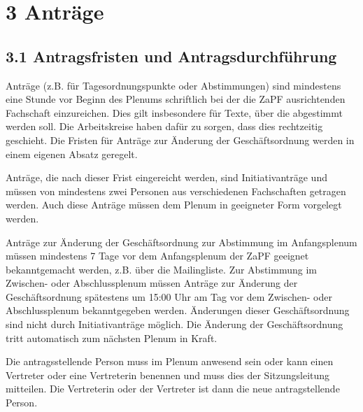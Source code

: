 \documentclass[12pt,oneside]{scrartcl}
\begin{document}
\section{3 Anträge%
  \label{antrage}%
}


\subsection{3.1 Antragsfristen und Antragsdurchführung%
  \label{antragsfristen-und-antragsdurchfuhrung}%
}
\setcounter{listcnt0}{0}
\begin{list}{.}
{
\setlength{\rightmargin}{\leftmargin}
}

\item Anträge (z.B. für Tagesordnungspunkte oder Abstimmungen) sind mindestens
eine Stunde vor Beginn des Plenums schriftlich bei der die ZaPF
ausrichtenden Fachschaft einzureichen.
Dies gilt insbesondere für Texte, über die abgestimmt werden soll.
Die Arbeitskreise haben dafür zu sorgen, dass dies rechtzeitig geschieht.
Die Fristen für Anträge zur Änderung der Geschäftsordnung werden in einem
eigenen Absatz geregelt.

\item Anträge, die nach dieser Frist eingereicht werden, sind Initiativanträge
und müssen von mindestens zwei Personen aus verschiedenen Fachschaften
getragen werden. Auch diese Anträge müssen dem Plenum in geeigneter Form
vorgelegt werden.

\item Anträge zur Änderung der Geschäftsordnung zur Abstimmung im Anfangsplenum
müssen mindestens 7 Tage vor dem Anfangsplenum der ZaPF geeignet
bekanntgemacht werden, z.B. über die Mailingliste.
Zur Abstimmung im Zwischen- oder Abschlussplenum müssen Anträge zur Änderung
der Geschäftsordnung spätestens um 15:00 Uhr am Tag vor dem Zwischen- oder
Abschlussplenum bekanntgegeben werden.
Änderungen dieser Geschäftsordnung sind nicht durch Initiativanträge möglich.
Die Änderung der Geschäftsordnung tritt automatisch zum nächsten Plenum in Kraft.

\item Die antragsstellende Person muss im Plenum anwesend sein
oder kann einen Vertreter oder eine Vertreterin benennen und muss dies
der Sitzungsleitung mitteilen.
Die Vertreterin oder der Vertreter ist dann die neue antragstellende Person.
\end{list}
\end{document}
